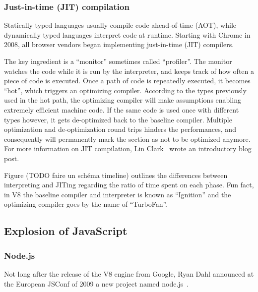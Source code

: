 \subsubsection{Just-in-time (JIT) compilation}%
\label{ssub:just_in_time_jit_compilation}

Statically typed languages usually compile code ahead-of-time (AOT),
while dynamically typed languages interpret code at runtime.
Starting with Chrome in 2008, all browser vendors began implementing
just-in-time (JIT) compilers.

The key ingredient is a ``monitor'' sometimes called ``profiler''.
The monitor watches the code while it is run by the interpreter,
and keeps track of how often a piece of code is executed.
Once a path of code is repeatedly executed, it becomes ``hot'',
which triggers an optimizing compiler.
According to the types previously used in the hot path,
the optimizing compiler will make assumptions enabling
extremely efficient machine code.
If the same code is used once with different types however,
it gets de-optimized back to the baseline compiler.
Multiple optimization and de-optimization round trips
hinders the performances, and consequently will permanently mark
the section as not to be optimized anymore.
For more information on JIT compilation, Lin Clark~\cite{clark-jit}
wrote an introductory blog post.

Figure (\alert{TODO faire un schéma timeline}) outlines the differences between
interpreting and JITing regarding the ratio of time spent on each phase.
Fun fact, in V8 the baseline compiler and interpreter is known as ``Ignition''
and the optimizing compiler goes by the name of ``TurboFan''.

%
%
%


\subsection{Explosion of JavaScript}%
\label{sub:explosion_of_javascript}


\subsubsection{Node.js}%
\label{ssub:node_js}

Not long after the release of the V8 engine from Google,
Ryan Dahl announced at the European JSConf of 2009
a new project named node.js~\cite{node-js-speaker}.
